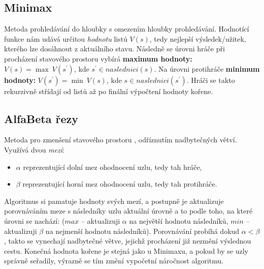 \subsection*{Minimax}
Metoda \cite{AI1} prohledávání do hloubky s omezením hloubky prohledávání. Hodnotící funkce nám udává určitou \textit{hodnotu} listů $V(s)$, tedy nejlepší výsledek/užitek, kterého lze dosáhnout z aktuálního stavu.
Následně se úrovni hráče při procházení stavového prostoru vybírá \textbf{maximum hodnoty:} $V(s) = \max \: V(s^\prime)$, kde $s^\prime \in naslednici(s)$. 
\newline
Na úrovni protihráče \textbf{minimum hodnoty:} $V(s^\prime) = \min \: V(s)$, kde $s \in naslednici(s^\prime)$. Hráči se takto rekurzivně střídají od listů až po finální výpočtení hodnoty kořene.

\subsection*{AlfaBeta řezy}
Metoda pro zmenšení stavového prostoru \cite{AI1}, odříznutím nadbytečných větví. Využívá dvou \textit{mezí}:
\begin{itemize}
\item \boldmath$\alpha$ reprezentující dolní mez ohodnocení uzlu, tedy tah hráče,
\item \boldmath$\beta$ reprezentující horní mez ohodnocení uzlu, tedy tah protihráče.
\end{itemize}
Algoritmus si pamatuje hodnoty svých mezí, a postupně je aktualizuje porovnáváním meze s následníky uzlu aktuální úrovně a to podle toho, na které úrovni se nachází: ($max$ -- aktualizuji $\alpha$ na největší hodnotu následníků, $min$ -- aktualizuji $\beta$ na nejmenší hodnotu následníků). Porovnávání probíhá dokud $\alpha < \beta$, takto se vynechají nadbytečné větve, jejichž procházení již nezmění výslednou cestu. Konečná hodnota kořene je stejná jako u Minimaxu, a pokud by se uzly správně seřadily, výrazně se tím změní vypočetní náročnost algoritmu.
 
